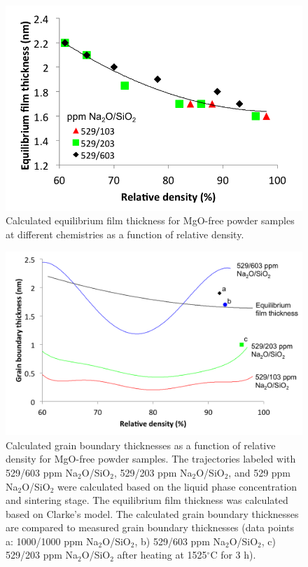 \newpage
\begin{figure}[H]
	\centering
	\includegraphics[width=\textwidth]{Chapter-4/Figures/Figure8.png}
	\caption{Calculated equilibrium film thickness for MgO-free powder samples at different chemistries as a function of relative density.}
	\label{Ch4-figure:Figure8}
\end{figure}

\newpage
\begin{figure}[H]
	\centering
	\includegraphics[width=\textwidth]{Chapter-4/Figures/Figure9.png}
	\caption{Calculated grain boundary thicknesses as a function of relative density for MgO-free powder samples. The trajectories labeled with 529/603 ppm Na$_{2}$O/SiO$_{2}$, 529/203 ppm Na$_{2}$O/SiO$_{2}$, and 529 ppm Na$_{2}$O/SiO$_{2}$ were calculated based on the liquid phase concentration and sintering stage. The equilibrium film thickness was calculated based on Clarke's model. The calculated grain boundary thicknesses are compared to measured grain boundary thicknesses (data points a: 1000/1000 ppm Na$_{2}$O/SiO$_{2}$, b) 529/603 ppm Na$_{2}$O/SiO$_{2}$, c) 529/203 ppm Na$_{2}$O/SiO$_{2}$ after heating at 1525$^{\circ}$C for 3 h).}
	\label{Ch4-figure:Figure9}
\end{figure}


